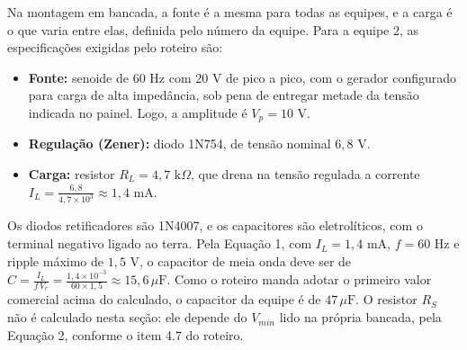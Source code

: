 \documentclass[11pt,a4paper]{article}
\begin{document}
\begin{especbancada}

Na montagem em bancada, a fonte é a mesma para todas as equipes, e a carga é o que varia entre elas, definida pelo número da equipe. Para a equipe 2, as especificações exigidas pelo roteiro são:

\begin{itemize}
    \item \textbf{Fonte:} senoide de 60 Hz com $20\text{ V}$ de pico a pico, com o gerador configurado para carga de alta impedância, sob pena de entregar metade da tensão indicada no painel. Logo, a amplitude é $V_p = 10\text{ V}$.

    \vspace{0.3cm}

    \item \textbf{Regulação (Zener):} diodo 1N754, de tensão nominal $6{,}8\text{ V}$.

    \vspace{0.3cm}

    \item \textbf{Carga:} resistor $R_L = 4{,}7\text{ k}\Omega$, que drena na tensão regulada a corrente $I_L = \frac{6{,}8}{4{,}7\times10^{3}} \approx 1{,}4\text{ mA}$.
\end{itemize}

\end{especbancada}

Os diodos retificadores são 1N4007, e os capacitores são eletrolíticos, com o terminal negativo ligado ao terra. Pela Equação 1, com $I_L = 1{,}4\text{ mA}$, $f = 60\text{ Hz}$ e ripple máximo de $1{,}5\text{ V}$, o capacitor de meia onda deve ser de $C = \frac{I_L}{f\,V_r} = \frac{1{,}4\times10^{-3}}{60 \times 1{,}5} \approx 15{,}6\,\mu\text{F}$. Como o roteiro manda adotar o primeiro valor comercial acima do calculado, o capacitor da equipe é de $47\,\mu\text{F}$. O resistor $R_S$ não é calculado nesta seção: ele depende do $V_{min}$ lido na própria bancada, pela Equação 2, conforme o item 4.7 do roteiro.
\end{document}
